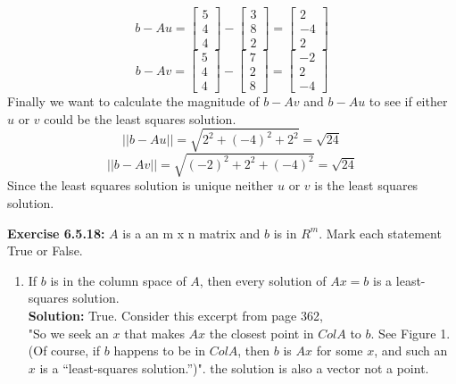 \documentclass{amsart}
\begin{document}
\begin{enumerate}
\begin{equation*}
b - Au = 
\begin{bmatrix}
5\\
4\\
4
\end{bmatrix} - 
\begin{bmatrix}
3\\
8\\
2
\end{bmatrix} = 
 \begin{bmatrix}
2\\
-4\\
2
\end{bmatrix}
\end{equation*}
\begin{equation*}
b - Av = 
\begin{bmatrix}
5\\
4\\
4
\end{bmatrix} - 
 \begin{bmatrix}
7\\
2\\
8
\end{bmatrix} = 
 \begin{bmatrix}
-2\\
2\\
-4
\end{bmatrix}
\end{equation*}
Finally we want to calculate the magnitude of $b - Av$ and $b - Au$ to see if either $u$ or $v$ could be the least squares solution.
\begin{equation*}
||b - Au|| = \sqrt{2^2+(-4)^2+2^2} = \sqrt{24}
\end{equation*}
\begin{equation*}
||b - Av|| = \sqrt{(-2)^2+2^2+(-4)^2} = \sqrt{24}
\end{equation*}
Since the least squares solution is unique neither $u$ or $v$ is the least squares solution.
\vspace{1in}




\noindent\textbf{Exercise 6.5.18: } $A$ is a an m x n matrix and $b$ is in $R^m$. Mark each statement True or False.\\

\begin{enumerate}

\item If $b$ is in the column space of $A$, then every solution of $Ax = b$ is a least-squares solution.\\
\textbf{Solution: }True. Consider this excerpt from page 362,\\
"So we seek an $x$ that makes $Ax$ the closest point in $Col A$ to $b$. See Figure 1. (Of course, if $b$ happens to be in $Col A$, then $b$ is $Ax$ for some $x$, and such an $x$ is a “least-squares solution.”)". the solution is also a vector not a point.
\vspace{1in}


\end{enumerate}
\end{enumerate}
\end{document}
